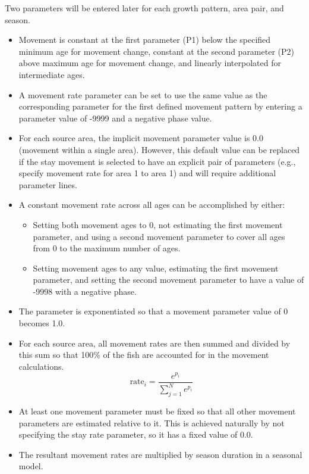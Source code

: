 Two parameters will be entered later for each growth pattern, area pair, and season.
\begin{itemize}
	\item Movement is constant at the first parameter (P1) below the specified minimum age for movement change, constant at the second parameter (P2) above maximum age for movement change, and linearly interpolated for intermediate ages.
	\item A movement rate parameter can be set to use the same value as the corresponding parameter for the first defined movement pattern by entering a parameter value of -9999 and a negative phase value.
	\item For each source area, the implicit movement parameter value is 0.0 (movement within a single area). However, this default value can be replaced if the stay movement is selected to have an explicit pair of parameters (e.g., specify movement rate for area 1 to area 1) and will require additional parameter lines.
	\item A constant movement rate across all ages can be accomplished by either:
	\begin{itemize}
		\item Setting both movement ages to 0, not estimating the first movement parameter, and using a second movement parameter to cover all ages from 0 to the maximum number of ages.
		\item Setting movement ages to any value, estimating the first movement parameter, and setting the second movement parameter to have a value of -9998 with a negative phase.
	\end{itemize} 
	\item The parameter is exponentiated so that a movement parameter value of 0 becomes 1.0.
	\item For each source area, all movement rates are then summed and divided by this sum so that 100\% of the fish are accounted for in the movement calculations.
	\begin{equation}
	\text{rate}_i = \frac{e^{p_i}}{\sum_{j=1}^{N}e^{p_i}}
	\end{equation}
	\item At least one movement parameter must be fixed so that all other movement parameters are estimated relative to it. This is achieved naturally by not specifying the stay rate parameter, so it has a fixed value of 0.0.
	\item The resultant movement rates are multiplied by season duration in a seasonal model.	
\end{itemize}

